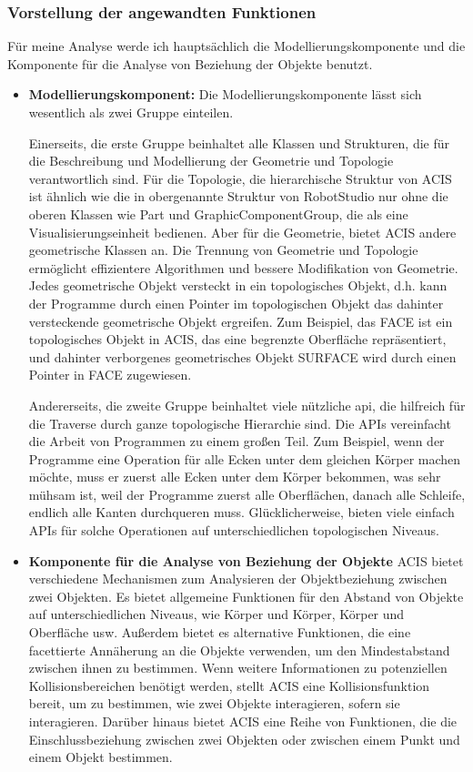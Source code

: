 \documentclass[14pt,a4paper,titlepage]{article}
\begin{document}
			\subsubsection{Vorstellung der angewandten Funktionen}
			Für meine Analyse werde ich hauptsächlich die Modellierungskomponente und die Komponente für die Analyse von Beziehung der Objekte benutzt. 
			\begin{itemize}
				\item 
				\textbf{Modellierungskomponent:}
				Die Modellierungskomponente lässt sich wesentlich als zwei Gruppe einteilen.
				
				 Einerseits, die erste Gruppe beinhaltet alle Klassen und Strukturen, die für die Beschreibung und Modellierung der Geometrie und Topologie verantwortlich sind. Für die Topologie, die hierarchische Struktur von ACIS ist ähnlich wie die in obergenannte Struktur von RobotStudio nur ohne die oberen Klassen wie Part und GraphicComponentGroup, die als eine Visualisierungseinheit bedienen. Aber für die Geometrie, bietet ACIS andere geometrische Klassen an. Die Trennung von Geometrie und Topologie ermöglicht effizientere Algorithmen und bessere Modifikation von Geometrie. Jedes geometrische Objekt versteckt in ein topologisches Objekt, d.h. kann der Programme durch einen Pointer im topologischen Objekt das dahinter versteckende geometrische Objekt ergreifen. Zum Beispiel, das FACE ist ein topologisches Objekt in ACIS, das eine begrenzte Oberfläche repräsentiert, und dahinter verborgenes geometrisches Objekt SURFACE wird durch einen Pointer in FACE zugewiesen.
				 
				 Andererseits, die zweite Gruppe beinhaltet viele nützliche \ac{api}, die hilfreich für die Traverse durch ganze topologische Hierarchie sind.  Die APIs vereinfacht die Arbeit von Programmen zu einem großen Teil. Zum Beispiel, wenn der Programme eine Operation für alle Ecken unter dem gleichen Körper machen möchte, muss er zuerst alle Ecken unter dem Körper bekommen, was sehr mühsam ist, weil der Programme zuerst alle Oberflächen, danach alle Schleife, endlich alle Kanten durchqueren muss.  Glücklicherweise, bieten viele einfach APIs für solche Operationen auf unterschiedlichen topologischen Niveaus. 
				\pagebreak
				\item 
				\textbf{Komponente für die Analyse von Beziehung der Objekte}
				ACIS bietet verschiedene Mechanismen zum Analysieren der Objektbeziehung zwischen zwei Objekten. Es bietet allgemeine Funktionen für den Abstand von Objekte auf unterschiedlichen Niveaus, wie Körper und Körper, Körper und Oberfläche usw.  Außerdem bietet es alternative Funktionen, die eine facettierte Annäherung an die Objekte verwenden, um den Mindestabstand zwischen ihnen zu bestimmen. Wenn weitere Informationen zu potenziellen Kollisionsbereichen benötigt werden, stellt ACIS eine Kollisionsfunktion bereit, um zu bestimmen, wie zwei Objekte interagieren, sofern sie interagieren. Darüber hinaus bietet ACIS eine Reihe von Funktionen, die die Einschlussbeziehung zwischen zwei Objekten oder zwischen einem Punkt und einem Objekt bestimmen.
				
			\end{itemize}
\end{document}
